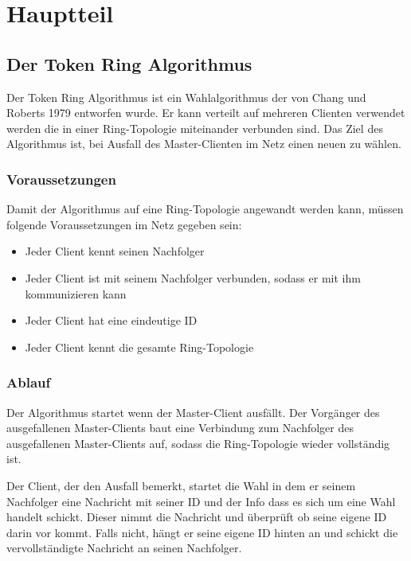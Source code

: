 \section{Hauptteil} 

\subsection{Der Token Ring Algorithmus}
Der Token Ring Algorithmus ist ein Wahlalgorithmus der von Chang und Roberts 1979 entworfen wurde. Er kann verteilt auf mehreren Clienten verwendet werden die in einer Ring-Topologie miteinander verbunden sind. Das Ziel des Algorithmus ist, bei Ausfall des Master-Clienten im Netz einen neuen zu wählen.

\subsubsection*{Voraussetzungen}
Damit der Algorithmus auf eine Ring-Topologie angewandt werden kann, müssen folgende Voraussetzungen im Netz gegeben sein:
\begin{itemize}
	\item Jeder Client kennt seinen Nachfolger
	\item Jeder Client ist mit seinem Nachfolger verbunden, sodass er mit ihm kommunizieren kann
	\item Jeder Client hat eine eindeutige ID
	\item Jeder Client kennt die gesamte Ring-Topologie
\end{itemize}

\subsubsection*{Ablauf}\label{sec:algorithm_process}
Der Algorithmus startet wenn der Master-Client ausfällt. Der Vorgänger des ausgefallenen Master-Clients baut eine Verbindung zum Nachfolger des ausgefallenen Master-Clients auf, sodass die Ring-Topologie wieder vollständig ist.

Der Client, der den Ausfall bemerkt, startet die Wahl in dem er seinem Nachfolger eine Nachricht mit seiner ID und der Info dass es sich um eine Wahl handelt schickt. Dieser nimmt die Nachricht und überprüft ob seine eigene ID darin vor kommt. Falls nicht, hängt er seine eigene ID hinten an und schickt die vervollständigte Nachricht an seinen Nachfolger.

